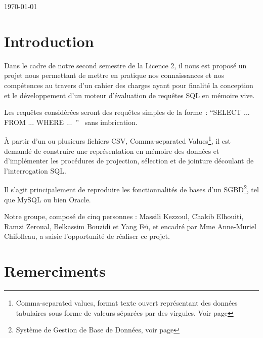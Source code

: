 \documentclass[oneside,13pt,a4paper]{report}
\begin{document}
\begin{titlepage}
	\par\vspace{1cm}

	\vfill

	{\large \today\par}
\end{titlepage}





\parskip=5pt
\chapter*{Introduction}

Dans le cadre de notre second semestre de la Licence 2,
il nous est proposé un projet nous permettant de mettre en pratique nos connaissances et nos compétences
au travers d’un cahier des charges ayant pour finalité la conception et le développement d’un moteur d’évaluation de requêtes SQL en mémoire vive.

Les requêtes considérées seront des requêtes simples de la forme : \enquote{SELECT ... FROM ... WHERE ... }  sans imbrication.

À partir d’un ou plusieurs fichiers CSV, Comma-separated Values\footnote{Comma-separated values, format texte ouvert représentant des données tabulaires sous forme de valeurs séparées par des virgules. Voir page \pageref{csv}},
il est demandé de construire une représentation en mémoire des données et d’implémenter les procédures de projection,
sélection et de jointure découlant de l’interrogation SQL.

Il s’agit principalement de reproduire les fonctionnalités de bases d’un SGBD\footnote{Système de Gestion de Base de Données, voir page \pageref{sgbd}}, tel que MySQL ou bien Oracle.

Notre groupe, composé de cinq personnes : Massili Kezzoul, Chakib Elhouiti, Ramzi Zeroual, Belkassim Bouzidi et Yang Feï, et encadré par Mme Anne-Muriel Chifolleau,
a saisie l'opportunité de réaliser ce projet.

\chapter*{Remerciments}

\parskip=0pt
\tableofcontents

\parskip=5pt
\end{document}
